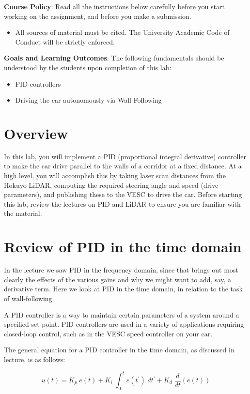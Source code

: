\documentclass[a4 paper]{article}
\begin{document}
\textbf{Course Policy}: Read all the instructions below carefully before you start working on the assignment, and before you make a submission.
\begin{itemize}
    \item All sources of material must be cited. The University Academic Code of Conduct
will be strictly enforced.
\end{itemize}
\textbf{Goals and Learning Outcomes}: The following fundamentals should be understood by the students upon completion of this lab:
\begin{itemize}
    \item PID controllers
    \item Driving the car autonomously via Wall Following
\end{itemize}
\section{Overview}
In this lab, you will implement a PID (proportional integral derivative) controller to make
the car drive parallel to the walls of a corridor at a fixed distance. At a high level, you will accomplish this by taking laser scan distances from the Hokuyo LiDAR, computing the required steering angle and speed (drive parameters), and publishing these to the VESC to drive the
car. Before starting this lab, review the lectures on PID and LiDAR to ensure you are familiar with the material.


\section{Review of PID in the time domain}
In the lecture we saw PID in the frequency domain, since that brings out most clearly the effects of the various gains and why we might want to add, say, a derivative term.
Here we look at PID in the time domain, in relation to the task of wall-following.

A PID controller is a way to maintain certain parameters of a system around a specified set point. PID controllers are used in a variety of applications requiring closed-loop control, such as in the VESC speed controller on your car.

The general equation for a PID controller in the time domain, as discussed in lecture, is as follows:

\begin{equation*}
u(t) = K_{p} \; e(t) + K_{i}\; \int_{0}^{t}e(t^{\prime}) \; dt^{\prime} + K_{d}\; \frac{d}{dt}(e(t))
\end{equation*}
\end{document}
